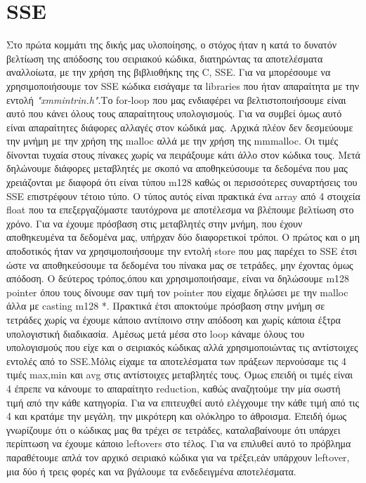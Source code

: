 \documentclass{FR16}
\begin{document}
\section{SSE}
Στο πρώτα κομμάτι της δικής μας υλοποίησης, ο στόχος ήταν η κατά το δυνατόν βελτίωση της απόδοσης του σειριακού κώδικα, διατηρώντας τα αποτελέσματα αναλλοίωτα, με την χρήση της βιβλιοθήκης της C, SSE. Για να μπορέσουμε να χρησιμοποιήσουμε τον SSE κώδικα εισάγαμε τα libraries που ήταν απαραίτητα με την εντολή \textit{"xmmintrin.h"}.Το for-loop που μας ενδιαφέρει να βελτιστοποιήσουμε είναι αυτό που κάνει όλους τους απαραίτητους υπολογισμούς. Για να συμβεί όμως αυτό είναι απαραίτητες διάφορες αλλαγές στον κώδικά μας. Αρχικά πλέον δεν δεσμεύουμε την μνήμη με την χρήση της malloc αλλά με την χρήση της mmmalloc. Οι τιμές δίνονται τυχαία στους πίνακες χωρίς να πειράξουμε κάτι άλλο στον κώδικα τους. Μετά δηλώνουμε διάφορες μεταβλητές με σκοπό να αποθηκεύσουμε τα δεδομένα που μας χρειάζονται με διαφορά ότι είναι τύπου m128 καθώς οι περισσότερες συναρτήσεις του SSE επιστρέφουν τέτοιο τύπο. Ο τύπος αυτός είναι πρακτικά ένα array από 4 στοιχεία float που τα επεξεργαζόμαστε ταυτόχρονα με 
αποτέλεσμα να βλέπουμε βελτίωση στο χρόνο.\newline
Για να έχουμε πρόσβαση στις μεταβλητές στην μνήμη, που έχουν αποθηκευμένα τα δεδομένα μας, υπήρχαν δύο διαφορετικοί τρόποι. Ο πρώτος και ο μη αποδοτικός ήταν να χρησιμοποιήσουμε την εντολή store που μας παρέχει το SSE έτσι ώστε να αποθηκεύσουμε τα δεδομένα του πίνακα μας σε τετράδες, μην έχοντας όμως απόδοση. Ο δεύτερος τρόπος,όπου και χρησιμοποιήσαμε, είναι να δηλώσουμε m128 pointer όπου τους δίνουμε σαν τιμή τον pointer που είχαμε δηλώσει με την malloc άλλα με casting m128 *. Πρακτικά έτσι αποκτούμε πρόσβαση στην μνήμη σε τετράδες χωρίς να έχουμε κάποιο αντίποινο στην απόδοση και χωρίς κάποια έξτρα υπολογιστική διαδικασία. \newline
Αμέσως μετά μέσα στο loop κάναμε όλους του υπολογισμούς που είχε και ο σειριακός κώδικας αλλά χρησιμοποιώντας τις αντίστοιχες εντολές από το SSE.Μόλις είχαμε τα αποτελέσματα των πράξεων περνούσαμε τις 4 τιμές max,min και avg στις αντίστοιχες μεταβλητές τους. Όμως επειδή οι τιμές είναι 4 έπρεπε να κάνουμε το απαραίτητο reduction, καθώς αναζητούμε την μία σωστή τιμή από την κάθε κατηγορία. Για να επιτευχθεί αυτό ελέγχουμε την κάθε τιμή από τις 4 και κρατάμε την μεγάλη, την μικρότερη και ολόκληρο το άθροισμα. Επειδή όμως γνωρίζουμε ότι ο κώδικας μας θα τρέχει σε τετράδες, καταλαβαίνουμε ότι υπάρχει περίπτωση να έχουμε κάποιο leftovers στο τέλος. Για να επιλυθεί αυτό το πρόβλημα παραθέτουμε απλά τον αρχικό σειριακό κώδικα για να τρέξει,εάν υπάρχουν leftover, μια δύο ή τρεις φορές και να βγάλουμε τα ενδεδειγμένα αποτελέσματα.\newline
\end{document}
